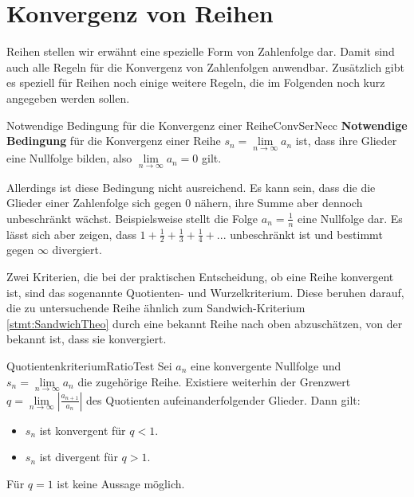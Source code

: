 \section{Konvergenz von Reihen}

Reihen stellen wir erwähnt eine spezielle Form von Zahlenfolge dar. Damit sind auch alle Regeln für die Konvergenz von Zahlenfolgen anwendbar. Zusätzlich gibt es speziell für Reihen noch einige weitere Regeln, die im Folgenden noch kurz angegeben werden sollen.

\begin{statement}{Notwendige Bedingung für die Konvergenz einer Reihe}{ConvSerNecc}
    \textbf{Notwendige Bedingung} für die Konvergenz einer Reihe $s_n = \lim\limits_{n\to\infty} a_n$ ist, dass ihre Glieder eine Nullfolge bilden, also $\lim\limits_{n\to\infty} a_n = 0$ gilt.
\end{statement}

Allerdings ist diese Bedingung nicht ausreichend. Es kann sein, dass die die Glieder einer Zahlenfolge sich gegen $0$ nähern, ihre Summe aber dennoch unbeschränkt wächst. Beispielsweise stellt die Folge $a_n = \frac{1}{n}$ eine Nullfolge dar. Es lässt sich aber zeigen, dass $1 + \frac{1}{2} + \frac{1}{3} + \frac{1}{4} + ...$ unbeschränkt ist und bestimmt gegen $\infty$ divergiert.

Zwei Kriterien, die bei der praktischen Entscheidung, ob eine Reihe konvergent ist, sind das sogenannte Quotienten- und Wurzelkriterium. Diese beruhen darauf, die zu untersuchende Reihe ähnlich zum Sandwich-Kriterium \ref{stmt:SandwichTheo} durch eine bekannt Reihe nach oben abzuschätzen, von der bekannt ist, dass sie konvergiert.

\begin{statement}{Quotientenkriterium}{RatioTest}
    Sei $a_n$ eine konvergente Nullfolge und $s_n = \lim\limits_{n\to\infty} a_n$ die zugehörige Reihe. Existiere weiterhin der Grenzwert $q = \lim\limits_{n\to\infty} |\frac{a_{n+1}}{a_n}|$ des Quotienten aufeinanderfolgender Glieder. Dann gilt:

    \begin{itemize}
        \item $s_n$ ist konvergent für $q < 1$.
        \item $s_n$ ist divergent für $q > 1$.
    \end{itemize}

    Für $q=1$ ist keine Aussage möglich.
\end{statement}


